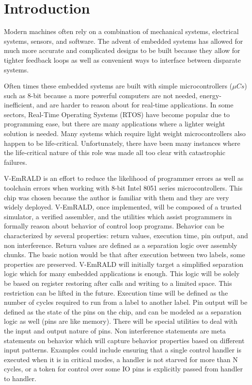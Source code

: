 \documentclass[preprint,11pt]{sigplanconf}
\begin{document}



\section{Introduction}
Modern machines often rely on a combination of mechanical systems,
electrical systems, sensors, and software. The advent of embedded systems
has allowed for much more accurate and complicated designs to be built because
they allow for tighter feedback loops as well as convenient ways to interface
between disparate systems.

Often times these embedded systems are built with simple
microcontrollers ($\mu Cs$) such as 8-bit because a more powerful
computers are not needed, energy-inefficient, and are harder to reason
about for real-time applications. In some sectors, Real-Time Operating
Systems (RTOS) have become popular due to programming ease, but there
are many applications where a lighter weight solution is needed. Many
systems which require light weight microcontrollers also happen to be
life-critical. Unfortunately, there have been many instances where the
life-critical nature of this role was made all too clear with
catastrophic failures.

V-EmRALD is an effort to reduce the likelihood of programmer errors as
well as toolchain errors when working with 8-bit Intel 8051 series
microcontrollers. This chip was chosen because the author is familiar
with them and they are very widely deployed. V-EmRALD, once
implemented, will be composed of a trusted simulator, a verified
assembler, and the utilities which assist programmers in formally
reason about behavior of control loop programs. Behavior can be
characterized by several properties: return values, execution time,
pin output, and non interference. Return values are defined as a
separation logic over assembly chunks. The basic notion would be that
after execution between two labels, some properties are
preserved. V-EmRALD will initially target a simplified separation
logic which for many embedded applications is enough. This logic will
be solely be based on register restoring after calls and writing to a
limited space. This restriction can be lifted in the future. Execution
time will be defined as the number of cycles required to run from a
label to another label. Pin output will be defined as the state of the
pins on the chip, and can be modeled as a separation logic as well
(pins are like memory). There will be special utilities to deal with
the input and output nature of pins. Non interference statements are
meta statements on behavior which will capture behavior properties
based on different input patterns. Examples could include ensuring
that a single control handler is executed when it is in critical
modes, a handler is not starved for more than N cycles, or a token for
control over some IO pins is explicitly passed from handler to
handler.
\end{document}
